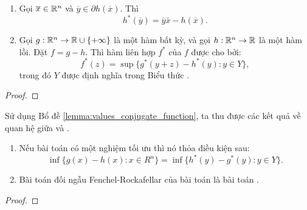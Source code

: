 \documentclass[a4paper]{report}
\begin{document}
    \begin{lemma}
        \label{lemma:values_conjugate_function}
        \begin{enumerate}[label=(\roman*)]
            \item Gọi $\overline{x} \in \mathbb{R}^n$ và $\overline{y} \in \partial h(\overline{x})$. Thì 
            \begin{equation}
                h^*(\overline{y}) = \bar{y}\bar{x} - h(\overline{x}).
            \end{equation}
            \item Gọi $g: \mathbb{R}^n \rightarrow \mathbb{R} \cup \{+\infty\}$ là một hàm bất kỳ, và gọi $h: \mathbb{R}^n \rightarrow \mathbb{R}$ là một hàm lồi. Đặt $f = g - h$. Thì hàm liên hợp $f^*$ của $f$ được cho bởi: 
            \begin{equation}
                f^*(z) = \sup\{g^*(y + z) - h^*(y): y \in Y\},
            \end{equation}
            trong đó $Y$ được định nghĩa trong Biểu thức .
        \end{enumerate}
    \end{lemma}
    \begin{proof}
        
    \end{proof}

    Sử dụng Bổ đề \ref{lemma:values_conjugate_function}, ta thu được các kết quả về quan hệ giữa  và .

    \begin{theorem}
        \begin{enumerate}[label=(\roman*)]
            \item Nếu bài toán  có một nghiệm tối ưu thì nó thỏa điều kiện sau:
            \begin{equation}
                \label{eq:dual_cond}
                \inf\{g(x) - h(x): x \in R^n\} = \inf\{h^*(y) - g^*(y): y \in Y\}.
            \end{equation}
            \item Bài toán đối ngẫu Fenchel-Rockafellar của bài toán  là bài toán .
        \end{enumerate}
    \end{theorem}
    \begin{proof}
        
    \end{proof}
\end{document}
